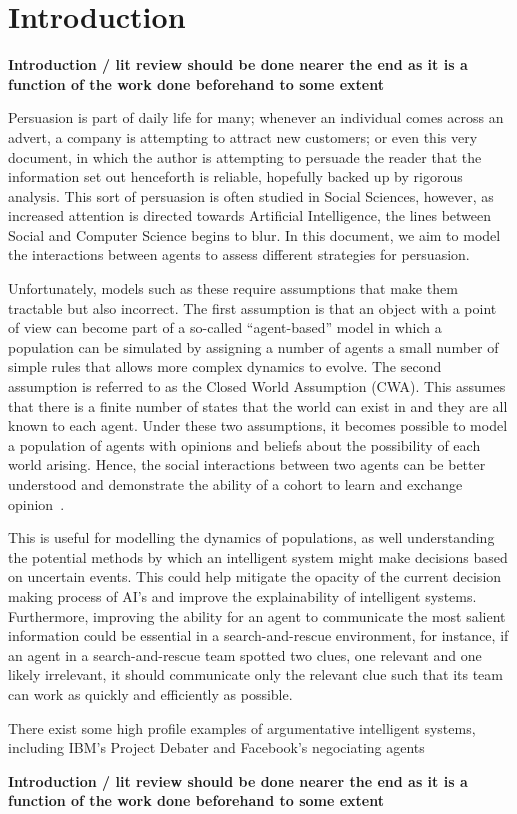 \newpage

\section{Introduction}

\textbf{Introduction / lit review should be done nearer the end as it is a function of the work done beforehand to some extent}

Persuasion is part of daily life for many; whenever an individual comes across an advert, a company is attempting to attract new customers; or even this very document, in which the author is attempting to persuade the reader that the information set out henceforth is reliable, hopefully backed up by rigorous analysis. This sort of persuasion is often studied in Social Sciences, however, as increased attention is directed towards Artificial Intelligence, the lines between Social and Computer Science begins to blur. In this document, we aim to model the interactions between agents to assess different strategies for persuasion. 

Unfortunately, models such as these require assumptions that make them tractable but also incorrect. The first assumption is that an object with a point of view can become part of a so-called ``agent-based'' model in which a population can be simulated by assigning a number of agents a small number of simple rules that allows more complex dynamics to evolve. The second assumption is referred to as the Closed World Assumption (CWA). This assumes that there is a finite number of states that the world can exist in and they are all known to each agent. Under these two assumptions, it becomes possible to model a population of agents with opinions and beliefs about the possibility of each world arising. Hence, the social interactions between two agents can be better understood and demonstrate the ability of a cohort to learn and exchange opinion~\cite{Wooldridge1995IntelligentPractice}. 

This is useful for modelling the dynamics of populations, as well understanding the potential methods by which an intelligent system might make decisions based on uncertain events. This could help mitigate the opacity of the current decision making process of AI's and improve the explainability of intelligent systems. Furthermore, improving the ability for an agent to communicate the most salient information could be essential in a search-and-rescue environment, for instance, if an agent in a search-and-rescue team spotted two clues, one relevant and one likely irrelevant, it should communicate only the relevant clue such that its team can work as quickly and efficiently as possible. 

There exist some high profile examples of argumentative intelligent systems, including IBM's Project Debater and Facebook's negociating agents

\textbf{Introduction / lit review should be done nearer the end as it is a function of the work done beforehand to some extent}

